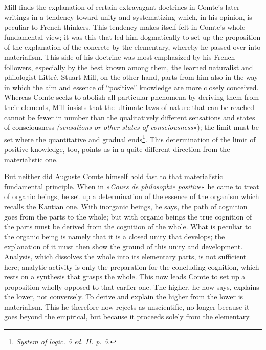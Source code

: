 \documentclass[12pt,a4paper,openany]{book}
\newcommand{\opage}[1]{\marginnote{\footnotesize\textit{[#1]}}}
\begin{document}
Mill finds the explanation of certain extravagant doctrines
in Comte's later writings in a tendency toward unity and
systematizing which, in his opinion, is peculiar to
French thinkers. This tendency makes itself felt in
Comte's whole fundamental view; it was this that led him
dogmatically to set up the proposition of the explanation of the concrete
\opage{206}by the elementary, whereby he passed over into materialism.
This side of his doctrine was most emphasized by his
French followers, especially by the best known among them,
the learned naturalist and philologist Littré. Stuart Mill,
on the other hand, parts from him also in the way in which
the aim and essence of ``positive'' knowledge are more closely conceived.
Whereas Comte seeks to abolish all particular phenomena by
deriving them from their elements, Mill insists that the
ultimate laws of nature that can be reached cannot be
fewer in number than the qualitatively different sensations and
states of consciousness \textit{(sensations or other states of consciousness}»);
the limit must be set where the quantitative and
gradual ends\footnote{\textit{System of logic. 5 ed. II. p. 5.}}. This determination of the limit of
positive knowledge, too, points us in a quite different direction
from the materialistic one.

But neither did Auguste Comte himself hold fast to that materialistic
fundamental principle. When in »\textit{Cours de philosophie
positive}« he came to treat of organic beings, he set up
a determination of the essence of the organism which
recalls the Kantian one. With inorganic beings, he says,
the path of cognition goes from the parts to the whole;
but with organic beings the true cognition
of the parts must be derived from the cognition of the whole.
What is peculiar to the organic being is namely that
it is a closed unity that develops; the explanation of
it must then show the ground of this unity and development.
Analysis, which dissolves the whole into its elementary parts, is
not sufficient here; analytic activity is only the preparation
for the concluding cognition, which rests on a
synthesis that grasps the whole. This now leads Comte to
set up a proposition wholly opposed to that earlier one.
The higher, he now says, explains the lower, not
conversely. To derive and explain the higher from the lower is
\opage{207}materialism. This he therefore now rejects as unscientific,
no longer because it goes beyond the empirical,
but because it proceeds solely from the elementary.
\end{document}
